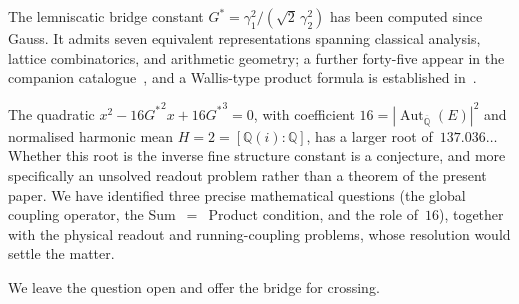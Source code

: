 \documentclass[12pt,reqno]{amsart}
\theoremstyle{definition}
\theoremstyle{remark}
\newcommand{\QQ}{\mathbb{Q}}
\newcommand{\Qbar}{\overline{\QQ}}
\newcommand{\Gstar}{G^{\!*}}
\newcommand{\Aut}{\operatorname{Aut}}
\begin{document}
The lemniscatic bridge constant
$\Gstar = \gamma_{1}^{2}/(\sqrt{2}\,\gamma_{2}^{2})$
has been computed since Gauss.  It admits seven equivalent representations
spanning classical analysis, lattice combinatorics, and arithmetic geometry;
a further forty-five appear in the companion catalogue~\cite{Paper2}, and a
Wallis-type product formula is established in~\cite{Paper3}.

The quadratic $x^{2}-16{{\Gstar}}^{2}x+16{{\Gstar}}^{3}=0$, with coefficient
$16={|\Aut_{\Qbar}(E)|}^{2}$ and normalised harmonic mean
$H=2=[\QQ(i):\QQ]$, has a larger root of~$137.036\ldots$  Whether this root
is the inverse fine structure constant is a conjecture, and more specifically
an unsolved readout problem rather than a theorem of the present paper.  We
have identified three precise mathematical questions (the global coupling
operator, the Sum~$=$~Product condition, and the role of~$16$), together with
the physical readout and running-coupling problems, whose resolution would
settle the matter.

We leave the question open and offer the bridge for crossing.


\end{document}
